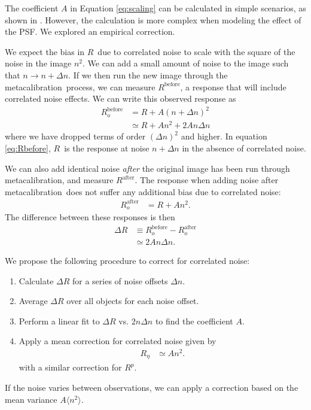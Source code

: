 \documentclass[a4paper,fleqn,usenatbib]{mnras}
\newcommand{\mcal}{metacalibration}
\newcommand{\mcalR}{$R$}
\newcommand{\mcalRpsf}{$R^{p}$}
\newcommand{\mcalRnoise}{$R_\eta$}
\begin{document}
The coefficient $A$ in Equation \ref{eq:scaling} can be calculated in simple
scenarios, as shown in \cite{HirataCorrNoise}.  However, the calculation is
more complex when modeling the effect of the PSF.  We explored an empirical
correction.

We expect the bias in \mcalR\ due to correlated noise to scale with the square
of the noise in the image $n^2$.  We can add a small
amount of noise to the image such that $n \rightarrow n + \Delta n$.  If we
then run the new image through the \mcal\ process, we can measure
$R^{\mathrm{before}}$, a response that will include correlated noise effects.
We can write this observed response as
\begin{align}\label{eq:Rbefore}
    R_o^{\mathrm{before}} &= R + A (n + \Delta n)^2 \nonumber \\
       &\simeq R + A n^2 + 2 A n \Delta n
\end{align}
where we have dropped terms of order $(\Delta n)^2$ and higher.  In equation
\ref{eq:Rbefore}, \mcalR\ is the response at noise $n+\Delta n$ in the absence
of correlated noise.  

We can also add identical noise {\em after} the original image  has been run
through \mcal, and measure $R^{\mathrm{after}}$.  The response when adding
noise after \mcal\ does not suffer any additional bias due to correlated noise:
\begin{align}
    R_o^{\mathrm{after}} &= R + A n^2.
\end{align}
The difference between these responses is then 
\begin{align}
    \Delta R &\equiv R_o^{\mathrm{before}} - R_o^{\mathrm{after}}  \nonumber \\
             &\simeq 2 A n \Delta n.
\end{align}

We propose the following procedure to correct for correlated noise:
\begin{enumerate}
    \item Calculate $\Delta R$ for a series of noise offsets $\Delta n$.
    \item Average $\Delta R$ over all objects for each noise offset.
    \item Perform a linear fit to $\Delta R$ vs. $2 n \Delta n$ to find the 
        coefficient $A$.
    \item Apply a mean correction for correlated noise given by
        \begin{align}
            \mbox{\mcalRnoise} & \simeq A n^2.
        \end{align}
        with a similar correction for \mcalRpsf.
\end{enumerate}
If the noise varies between observations, we can apply a 
correction based on the mean variance $A
\langle n^2 \rangle$.
\end{document}
